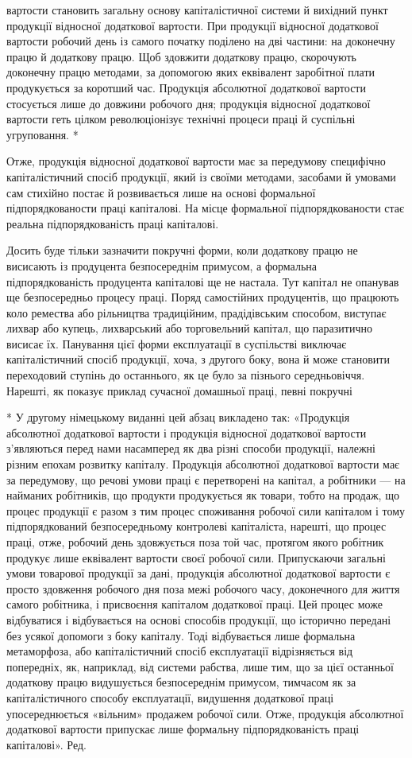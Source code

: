 вартости становить загальну основу капіталістичної системи
й вихідний пункт продукції відносної додаткової вартости. При
продукції відносної додаткової вартости робочий день із самого
початку поділено на дві частини: на доконечну працю й додаткову
працю. Щоб здовжити додаткову працю, скорочують доконечну
працю методами, за допомогою яких еквівалент заробітної
плати продукується за коротший час. Продукція абсолютної
додаткової вартости стосується лише до довжини робочого дня;
продукція відносної додаткової вартости геть цілком революціонізує
технічні процеси праці й суспільні угруповання. *

Отже, продукція відносної додаткової вартости має за передумову
специфічно капіталістичний спосіб продукції, який із
своїми методами, засобами й умовами сам стихійно постає й розвивається
лише на основі формальної підпорядкованости праці
капіталові. На місце формальної підпорядкованости стає реальна
підпорядкованість праці капіталові.

Досить буде тільки зазначити покручні форми, коли додаткову
працю не висисають із продуцента безпосереднім примусом,
а формальна підпорядкованість продуцента капіталові ще не настала.
Тут капітал не опанував ще безпосередньо процесу праці.
Поряд самостійних продуцентів, що працюють коло ремества
або рільництва традиційним, прадідівським способом, виступає
лихвар або купець, лихварський або торговельний капітал, що
паразитично висисає їх. Панування цієї форми експлуатації в
суспільстві виключає капіталістичний спосіб продукції, хоча,
з другого боку, вона й може становити переходовий ступінь до
останнього, як це було за пізнього середньовіччя. Нарешті, як
показує приклад сучасної домашньої праці, певні покручні

* У другому німецькому виданні цей абзац викладено так: «Продукція
абсолютної додаткової вартости і продукція відносної додаткової
вартости з’являються перед нами насамперед як два різні способи продукції,
належні різним епохам розвитку капіталу. Продукція абсолютної
додаткової вартости має за передумову, що речові умови праці є перетворені
на капітал, а робітники — на найманих робітників, що продукти
продукується як товари, тобто на продаж, що процес продукції є разом
з тим процес споживання робочої сили капіталом і тому підпорядкований
безпосередньому контролеві капіталіста, нарешті, що процес праці, отже,
робочий день здовжується поза той час, протягом якого робітник продукує
лише еквівалент вартости своєї робочої сили. Припускаючи загальні
умови товарової продукції за дані, продукція абсолютної додаткової вартости
є просто здовження робочого дня поза межі робочого часу, доконечного
для життя самого робітника, і присвоєння капіталом додаткової
праці. Цей процес може відбуватися і відбувається на основі способів
продукції, що історично передані без усякої допомоги з боку капіталу.
Тоді відбувається лише формальна метаморфоза, або капіталістичний
спосіб експлуатації відрізняється від попередніх, як, наприклад, від
системи рабства, лише тим, що за цієї останньої додаткову працю видушується
безпосереднім примусом, тимчасом як за капіталістичного способу
експлуатації, видушення додаткової праці упосереднюється «вільним»
продажем робочої сили. Отже, продукція абсолютної додаткової
вартости припускає лише формальну підпорядкованість праці капіталові». Ред.
